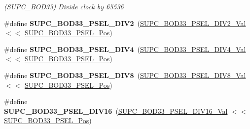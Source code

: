 \begin{DoxyCompactItemize}
\begin{DoxyCompactList}\small\item\em (S\+U\+P\+C\+\_\+\+B\+O\+D33) Divide clock by 65536 \end{DoxyCompactList}\item 
\hypertarget{group___s_a_m_l21___s_u_p_c_gafd8dc7f9fb229f339db35ee334c82f98}{}\#define {\bfseries S\+U\+P\+C\+\_\+\+B\+O\+D33\+\_\+\+P\+S\+E\+L\+\_\+\+D\+I\+V2}~(\hyperlink{group___s_a_m_l21___s_u_p_c_ga1985ff1cb7429062883c438da0448c04}{S\+U\+P\+C\+\_\+\+B\+O\+D33\+\_\+\+P\+S\+E\+L\+\_\+\+D\+I\+V2\+\_\+\+Val}      $<$$<$ \hyperlink{group___s_a_m_l21___s_u_p_c_ga749aed0ecd13c1a62c80e107cfe7e31f}{S\+U\+P\+C\+\_\+\+B\+O\+D33\+\_\+\+P\+S\+E\+L\+\_\+\+Pos})\label{group___s_a_m_l21___s_u_p_c_gafd8dc7f9fb229f339db35ee334c82f98}

\item 
\hypertarget{group___s_a_m_l21___s_u_p_c_gae34be40c9d69facaad1e2270f5887475}{}\#define {\bfseries S\+U\+P\+C\+\_\+\+B\+O\+D33\+\_\+\+P\+S\+E\+L\+\_\+\+D\+I\+V4}~(\hyperlink{group___s_a_m_l21___s_u_p_c_ga296753b7af0e528a1e3cb2bb50795d3b}{S\+U\+P\+C\+\_\+\+B\+O\+D33\+\_\+\+P\+S\+E\+L\+\_\+\+D\+I\+V4\+\_\+\+Val}      $<$$<$ \hyperlink{group___s_a_m_l21___s_u_p_c_ga749aed0ecd13c1a62c80e107cfe7e31f}{S\+U\+P\+C\+\_\+\+B\+O\+D33\+\_\+\+P\+S\+E\+L\+\_\+\+Pos})\label{group___s_a_m_l21___s_u_p_c_gae34be40c9d69facaad1e2270f5887475}

\item 
\hypertarget{group___s_a_m_l21___s_u_p_c_ga10a35f1eb4e4137220b5c563d79e5fcc}{}\#define {\bfseries S\+U\+P\+C\+\_\+\+B\+O\+D33\+\_\+\+P\+S\+E\+L\+\_\+\+D\+I\+V8}~(\hyperlink{group___s_a_m_l21___s_u_p_c_gae1a6fa310bec936ae5cdc61ad935ba08}{S\+U\+P\+C\+\_\+\+B\+O\+D33\+\_\+\+P\+S\+E\+L\+\_\+\+D\+I\+V8\+\_\+\+Val}      $<$$<$ \hyperlink{group___s_a_m_l21___s_u_p_c_ga749aed0ecd13c1a62c80e107cfe7e31f}{S\+U\+P\+C\+\_\+\+B\+O\+D33\+\_\+\+P\+S\+E\+L\+\_\+\+Pos})\label{group___s_a_m_l21___s_u_p_c_ga10a35f1eb4e4137220b5c563d79e5fcc}

\item 
\hypertarget{group___s_a_m_l21___s_u_p_c_gad00dadea2137165a86353d696b3bd3ed}{}\#define {\bfseries S\+U\+P\+C\+\_\+\+B\+O\+D33\+\_\+\+P\+S\+E\+L\+\_\+\+D\+I\+V16}~(\hyperlink{group___s_a_m_l21___s_u_p_c_gad3b22142b28b58c363efc9305f4116e5}{S\+U\+P\+C\+\_\+\+B\+O\+D33\+\_\+\+P\+S\+E\+L\+\_\+\+D\+I\+V16\+\_\+\+Val}     $<$$<$ \hyperlink{group___s_a_m_l21___s_u_p_c_ga749aed0ecd13c1a62c80e107cfe7e31f}{S\+U\+P\+C\+\_\+\+B\+O\+D33\+\_\+\+P\+S\+E\+L\+\_\+\+Pos})\label{group___s_a_m_l21___s_u_p_c_gad00dadea2137165a86353d696b3bd3ed}


\end{DoxyCompactItemize}
